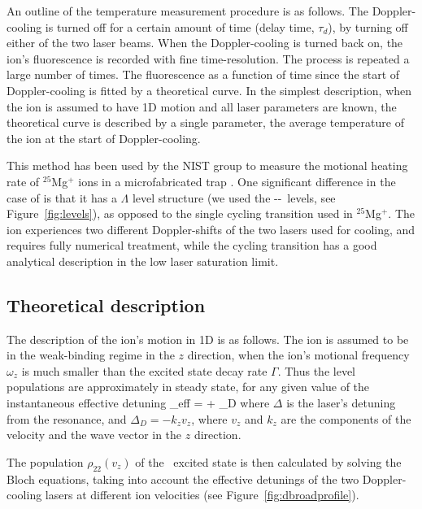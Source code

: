 An outline of the temperature measurement procedure is as follows. The Doppler-cooling is turned off for a certain amount of time (delay time, $\tau_d$), by turning off either of the two laser beams. When the Doppler-cooling is turned back on, the ion's fluorescence is recorded with fine time-resolution. The process is repeated a large number of times. The fluorescence as a function of time since the start of Doppler-cooling is fitted by a theoretical curve. In the simplest description, when the ion is assumed to have 1D motion and all laser parameters are known, the theoretical curve is described by a single parameter, the average temperature of the ion at the start of Doppler-cooling.

This method has been used by the NIST group to measure the motional heating rate of \mbox{$^{25}$Mg$^+$} ions in a microfabricated trap \cite{Epstein2007}. One significant difference in the case of  is that it has a $\Lambda$ level structure (we used the \soh-\poh-\dth\, levels, see Figure~\ref{fig:levels}), as opposed to the single cycling transition used in \mbox{$^{25}$Mg$^+$}. The ion experiences two different Doppler-shifts of the two lasers used for cooling, and requires fully numerical treatment, while the cycling transition has a good analytical description in the low laser saturation limit.

\subsection{Theoretical description}

The description of the ion's motion in 1D is as follows. The ion is assumed to be in the weak-binding regime in the $z$ direction, when the ion's motional frequency $\omega_z$ is much smaller than the excited state decay rate $\Gamma$. Thus the level populations are approximately in steady state, for any given value of the instantaneous effective detuning
\be
\Delta_{\mbox{eff}} = \Delta + \Delta_D
\ee
where $\Delta$ is the laser's detuning from the resonance, and $\Delta_D = - k_z v_z$, where $v_z$ and $k_z$ are the components of the velocity and the wave vector in the $z$ direction. 

The population $\rho_{22}(v_z)$ of the \poh\, excited state is then calculated by solving the Bloch equations, taking into account the effective detunings of the two Doppler-cooling lasers at different ion velocities (see Figure~\ref{fig:dbroadprofile}). 

